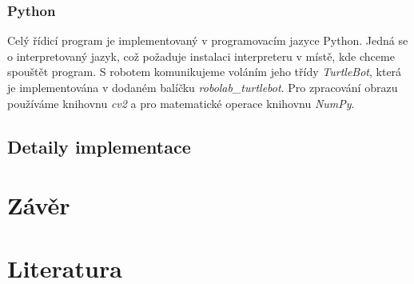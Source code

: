\documentclass{article}
\begin{document}
		\subsubsection{Python}
		Celý řídicí program je implementovaný v programovacím jazyce Python. Jedná se o interpretovaný jazyk, což požaduje instalaci interpreteru v místě, kde chceme spouštět program. S robotem komunikujeme voláním jeho třídy \textit{TurtleBot}, která je implementována v dodaném balíčku \textit{robolab\_turtlebot}. Pro zpracování obrazu používáme knihovnu \textit{cv2} a pro matematické operace knihovnu \textit{NumPy}.
		
		
	\subsection{Detaily implementace}
	
	
	

\section{Závěr}

\section{Literatura}
\end{document}
